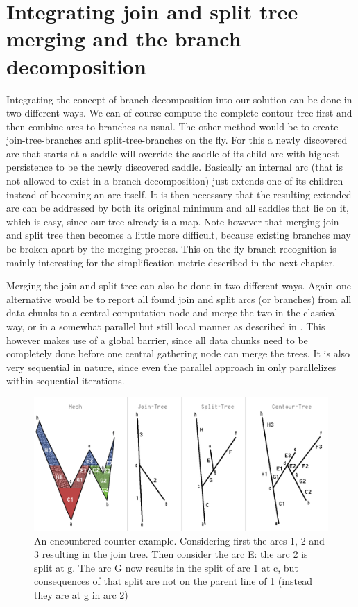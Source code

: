 \documentclass{scrartcl}
\begin{document}
\section{Integrating join and split tree merging and the branch decomposition}

Integrating the concept of branch decomposition into our solution can be done in two different ways. We can of course compute the complete contour tree first and then combine arcs to branches as usual. The other method would be to create join-tree-branches and split-tree-branches on the fly. For this a newly discovered arc that starts at a saddle will override the saddle of its child arc with highest persistence to be the newly discovered saddle. Basically an internal arc (that is not allowed to exist in a branch decomposition) just extends one of its children instead of becoming an arc itself. It is then necessary that the resulting extended arc can be addressed by both its original minimum and all saddles that lie on it, which is easy, since our tree already is a map. Note however that merging join and split tree then becomes a little more difficult, because existing branches may be broken apart by the merging process. This on the fly branch recognition is mainly interesting for the simplification metric described in the next chapter.

Merging the join and split tree can also be done in two different ways. Again one alternative would be to report all found join and split arcs (or branches) from all data chunks to a central computation node and merge the two in the classical way, or in a somewhat parallel but still local manner as described in \cite{Carr}. This however makes use of a global barrier, since all data chunks need to be completely done before one central gathering node can merge the trees. It is also very sequential in nature, since even the parallel approach in \cite{Carr} only parallelizes within sequential iterations. 

\begin{figure}
    \includegraphics[width=\linewidth]{CounterExample.png}
    \caption{An encountered counter example. Considering first the arcs 1, 2 and 3 resulting in the join tree. Then consider the arc E: the arc 2 is split at g. The arc G now results in the split of arc 1 at c, but consequences of that split are not on the parent line of 1 (instead they are at g in arc 2)}
    \label{fig:ce}
\end{figure}
\end{document}
